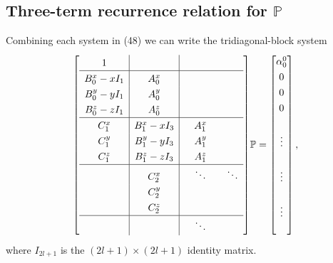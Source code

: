 \documentclass[11pt, oneside]{article}   	%
\newcommand{\bigP}{\mathbb{P}}
\begin{document}
\subsection{Three-term recurrence relation for \(\bigP\)}

Combining each system in (48) we can write the tridiagonal-block system
\begin{align}
\renewcommand\arraystretch{1.3}
\mleft[
\begin{array}{c|c|cc}
		1  & & & \\
		\hline 
		B^x_0 - xI_1 & A^x_0 & & \\
		B^y_0 - yI_1 & A^y_0 & & \\
		B^z_0 - zI_1 & A^z_0 & & \\
		\hline 
		C^x_1 & B^x_1 - xI_{3} & \quad A^x_1 \quad & \\
		C^y_1 & B^y_1 - yI_{3} & \quad A^y_1 \quad & \\
		C^z_1 & B^z_1 - zI_{3} & \quad A^z_1 \quad & \\
		\hline
		& C^x_2 & \ddots & \ddots \\
		& C^y_2 & & \\
		& C^z_2 & & \\
		\hline
		& & \ddots &
\end{array}
\mright]
\bigP
=
\begin{bmatrix}
	\alpha^0_0 \\ 0 \\ 0 \\ 0 \\ \\ \vdots \\ \\ \vdots \\ \\ \vdots \\ \\
\end{bmatrix},
\end{align}
where \(I_{2l+1}\) is the \((2l+1)\times(2l+1)\) identity matrix.
\end{document}
